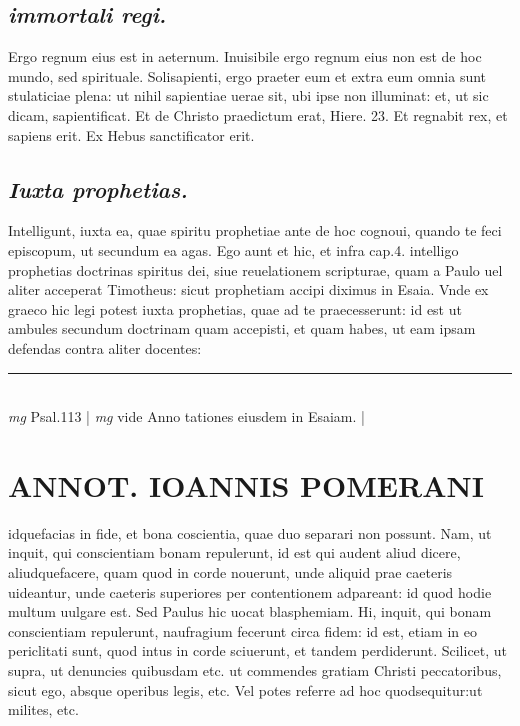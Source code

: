 \documentclass{article}
\begin{document}
\begin{pages}
\subsection*{\textit{immortali regi. }}\pstart Ergo regnum eius est in aeternum. Inuisibile ergo regnum eius non est de hoc mundo, sed spirituale. Solisapienti, ergo praeter eum et extra eum omnia sunt stulaticiae plena: ut nihil sapientiae uerae sit, ubi ipse non illuminat: et, ut sic dicam, sapientificat. Et de Christo praedictum erat, Hiere. 23. Et regnabit rex, et sapiens erit. Ex Hebus  sanctificator erit.  \pend
{}
{}
\subsection*{\textit{Iuxta prophetias. }}\pstart Intelligunt, iuxta ea, quae spiritu prophetiae ante de hoc cognoui, quando te feci episcopum, ut secundum ea agas. Ego aunt et hic, et infra cap.4. intelligo prophetias doctrinas spiritus dei, siue reuelationem scripturae, quam a Paulo uel aliter acceperat Timotheus: sicut prophetiam accipi diximus in Esaia. Vnde ex graeco hic legi potest iuxta prophetias, quae ad te praecesserunt: id est ut ambules secundum doctrinam quam accepisti, et quam habes, ut eam ipsam defendas contra aliter docentes:  \pend
\vspace{0.5cm}\noindent
\vspace{0.2cm}\rule{1cm}{0.2pt}\\ 
\hspace{0.2cm}\textit{mg}
\footnotesize Psal.113 
\normalsize| 
\hspace{0.2cm}\textit{mg}
\footnotesize vide Anno tationes eiusdem in Esaiam. 
\normalsize| 
\section*{ANNOT. IOANNIS POMERANI }\pstart idquefacias in fide, et bona coscientia, quae duo separari non possunt. Nam, ut inquit, qui conscientiam bonam repulerunt, id est qui audent aliud dicere, aliudquefacere, quam quod in corde nouerunt, unde aliquid prae caeteris uideantur, unde caeteris superiores per contentionem adpareant: id quod hodie multum uulgare est. Sed Paulus hic uocat blasphemiam. Hi, inquit, qui bonam conscientiam repulerunt, naufragium fecerunt circa fidem: id est, etiam in eo periclitati sunt, quod intus in corde sciuerunt, et tandem perdiderunt.  \pend\pstart Scilicet, ut supra, ut denuncies quibusdam etc. ut commendes gratiam Christi peccatoribus, sicut ego, absque  operibus legis, etc. Vel potes referre ad hoc quodsequitur:ut milites, etc.  \pend
{}
{}

\end{pages}
\end{document}
